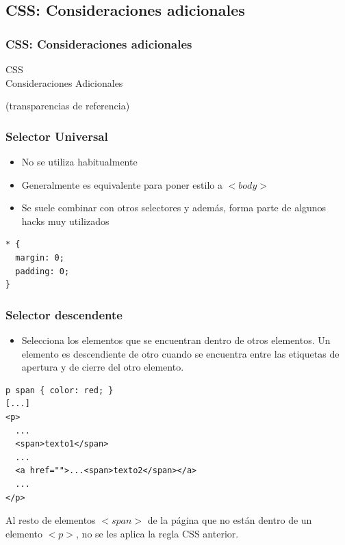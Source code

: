 


\subsection*{CSS: Consideraciones adicionales}

\begin{frame}[fragile]
\frametitle{CSS: Consideraciones adicionales}

\begin{center}
{\Huge CSS \\ Consideraciones Adicionales}

{\footnotesize (transparencias de referencia)}

\end{center}


\end{frame}




\begin{frame}[fragile]
\frametitle{Selector Universal}

\begin{itemize}
  \item No se utiliza habitualmente
  \item Generalmente es equivalente para poner estilo a $<body>$
  \item Se suele combinar con otros selectores y además, forma parte de algunos hacks muy utilizados
\end{itemize}

\begin{verbatim}
* {
  margin: 0;
  padding: 0;
}
\end{verbatim}

\end{frame}


\begin{frame}[fragile]
\frametitle{Selector descendente}

\begin{itemize}
  \item Selecciona los elementos que se encuentran dentro de otros elementos. Un elemento es descendiente de otro cuando se encuentra entre las etiquetas de apertura y de cierre del otro elemento.
\end{itemize}

\begin{verbatim}
p span { color: red; }
[...]
<p>
  ...
  <span>texto1</span>
  ...
  <a href="">...<span>texto2</span></a>
  ...
</p>
\end{verbatim}

Al resto de elementos $<span>$ de la página que no están dentro de un elemento $<p>$, no se les aplica la regla CSS anterior.

\end{frame}

